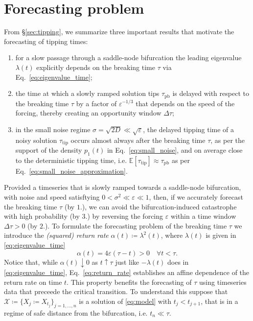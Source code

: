 \documentclass[11pt,a4paper]{article}
\theoremstyle{plain}
\theoremstyle{definition}
\theoremstyle{remark}
\newcommand{\E}{\mathbb{E}}
\begin{document}
\section{Forecasting problem}\label{sec:formulation}
From \S\ref{sec:tipping}, we summarize three important results that motivate the forecasting of tipping times:
%
\begin{enumerate}
        \item for a slow passage through a saddle-node bifurcation the leading eigenvalue $\lambda(t)$ explicitly depends on the breaking time $\tau$ via Eq.~\eqref{eq:eigenvalue_time};
        \item the time at which a slowly ramped solution tips $\tau_{\mathrm{pb}}$ is delayed with respect to the breaking time $\tau$ by a factor of $\varepsilon^{-1/3}$ that depends on the speed of the forcing, thereby creating an opportunity window $\Delta\tau$;
        \item in the small noise regime $\sigma=\sqrt{2D}\ll\sqrt{\varepsilon}$, the delayed tipping time of a noisy solution $\tau_{\mathrm{tip}}$ occurs almost always after the breaking time $\tau$, as per the support of the density $p_1(t)$ in Eq.~\eqref{eq:small_noise}, and on average close to the deterministic tipping time, i.e. $\E[\tau_{\mathrm{tip}}]\approx\tau_{\mathrm{pb}}$ as per Eq.~\eqref{eq:small_noise_approximation}.
\end{enumerate}
%
Provided a timeseries that is slowly ramped towards a saddle-node bifurcation, with noise and speed satisftying $0<\sigma^2\ll\varepsilon\ll1$, then, if we accurately forecast the breaking time $\tau$ (by $1.$), we can avoid the bifurcation-induced catastrophe with high probability (by $3.$) by reversing the forcing $\varepsilon$ within a time window $\Delta\tau>0$ (by $2.$).
To formulate the forecasting problem of the breaking time $\tau$ we introduce the \emph{(squared) return rate} $\alpha(t)\coloneqq\lambda^2(t)$, where $\lambda(t)$ is given in \eqref{eq:eigenvalue_time}
%
\begin{equation}\label{eq:return_rate}
        \alpha(t) = 4\varepsilon(\tau-t)>0\quad\forall t<\tau . 
\end{equation}
%
Notice that, while $\alpha(t)\downarrow0$ as $t\uparrow\tau$ just like $-\lambda(t)$ does in \eqref{eq:eigenvalue_time}, Eq.~\eqref{eq:return_rate} establishes an affine dependence of the return rate on time $t$.
This property benefits the forecasting of $\tau$ using timeseries data that preceede the critical transition.
To understand this suppose that $\mathcal{X}\coloneqq\{X_j\coloneqq X_{t_j}\}_{j=1,\dots,n}$ is a solution of \eqref{eq:model} with $t_j<t_{j+1}$, that is in a regime of safe distance from the bifurcation, i.e. $t_n\ll\tau$.
\end{document}
